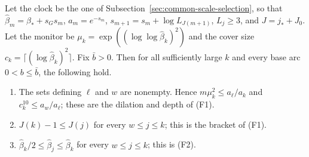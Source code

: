 \begin{lemma}
\label{lem:ex-lattice-firesky-clock-fields}
Let the clock be the one of Subsection~\ref{sec:common-scale-selection}, so
that $\widehat\beta_m=\beta_*+s_Gs_m$, $a_m=e^{-s_m}$,
$s_{m+1}=s_m+\log L_{J(m+1)}$, $L_j\ge3$, and $J=j_*+J_0$. Let the
monitor be $\mu_k=\exp((\log\log\widehat\beta_k)^2)$ and the cover size
$c_k=\lceil(\log\widehat\beta_k)^2\rceil$. Fix $\bar b>0$. Then for all
sufficiently large $k$ and every base arc $0<b\le\bar b$, the following
hold.
\begin{enumerate}
\item The sets defining $\ell$ and $w$ are nonempty. Hence
 $m\mu_k^2\le a_\ell/a_k$ and $c_k^{10}\le a_w/a_\ell$; these are the
 dilation and depth of (F1).
\item $J(k)-1\le J(j)$ for every $w\le j\le k$; this is the bracket of
 (F1).
\item $\widehat\beta_k/2\le\widehat\beta_j\le\widehat\beta_k$ for every
 $w\le j\le k$; this is (F2).
\end{enumerate}
\end{lemma}
